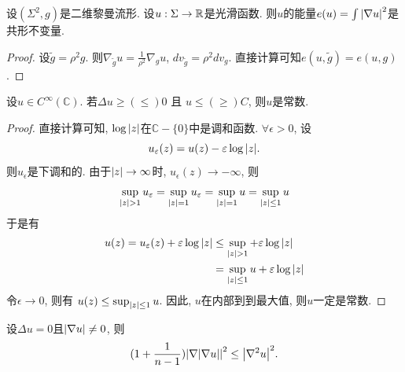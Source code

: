 \begin{lemma}
    设$(\Sigma^2,g)$是二维黎曼流形. 设$u: \Sigma \to {\mathbb{R}}$是光滑函数. 则$u$的能量$e(u)=\int {\left | \nabla u \right |}^2$是共形不变量.
\end{lemma}
\begin{proof}
    设$\tilde{g}=\rho^2g$.  则$\nabla_{\tilde{g}}u=\frac{1}{\rho^2}\nabla_gu$, $dv_{\tilde{g}}=\rho^2dv_g$. 直接计算可知$e(u,\tilde{g})=e(u,g)$.
\end{proof}
\begin{lemma}
    设$u\in C^{\infty}(\mathbb{C})$. 若$\Delta u  \ge(\le) 0$ 且 $u \le(\ge) C$, 则$u$是常数.
\end{lemma}
\begin{proof}
    直接计算可知, $\log{\left | z \right |}$在$\mathbb{C}-\{0\}$中是调和函数. $\forall \epsilon>0$, 设
    \begin{equation}
        u_\varepsilon(z)=u(z)-\varepsilon\log{\left | z \right |}.
    \end{equation}
    则$u_\epsilon$是下调和的. 由于${\left | z \right |} \to \infty$时, $u_\epsilon(z) \to -\infty$, 则
    \begin{equation}
        \sup_{{\left | z \right |}>1} u_\varepsilon = \sup_{{\left | z \right |}=1} u_\varepsilon=\sup_{{\left | z \right |}=1} u = \sup_{{\left | z \right |} \le 1} u
    \end{equation}
    于是有
    \begin{equation}
        \begin{split}
            u(z)=u_\varepsilon(z) + \varepsilon\log{\left | z \right |} &\le \sup_{{\left | z \right |}>1} + \varepsilon\log{\left | z \right |} \\
            &= \sup_{{\left | z \right |} \le 1}u + \varepsilon\log{\left | z \right |}
        \end{split}
    \end{equation}
    令$\epsilon \to 0$, 则有 $u(z) \le \sup_{{\left | z \right |} \le 1}u$. 因此, $u$在内部到到最大值, 则$u$一定是常数.
\end{proof}
\begin{lemma}[Kato不等式] \label{kato}
    设$\Delta u=0$且${\left | \nabla u \right |} \ne 0$, 则
    \begin{equation}
        (1+\frac{1}{n-1}) {\left | \nabla{\left | \nabla u \right |} \right |}^2 \le {\left | \nabla^2u \right |}^2.
    \end{equation}
\end{lemma}
